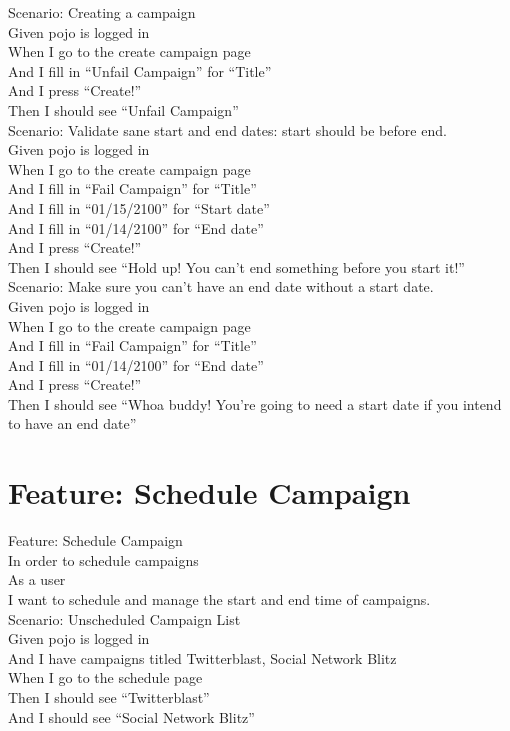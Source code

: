 \documentclass[12pt]{article}
\begin{document}
Scenario: Creating a campaign \\
Given pojo is logged in \\
When I go to the create campaign page \\
And I fill in ``Unfail Campaign'' for ``Title'' \\
And I press ``Create!'' \\
Then I should see ``Unfail Campaign'' \\

Scenario: Validate sane start and end dates: start should be before end. \\
Given pojo is logged in \\
When I go to the create campaign page \\
And I fill in ``Fail Campaign'' for ``Title'' \\
And I fill in ``01/15/2100'' for ``Start date'' \\
And I fill in ``01/14/2100'' for ``End date'' \\
And I press ``Create!'' \\
Then I should see ``Hold up! You can't end something before you start it!'' \\

Scenario: Make sure you can't have an end date without a start date. \\
Given pojo is logged in \\
When I go to the create campaign page \\
And I fill in ``Fail Campaign'' for ``Title'' \\
And I fill in ``01/14/2100'' for ``End date'' \\
And I press ``Create!'' \\
Then I should see ``Whoa buddy! You're going to need a start date if you intend to have an end date'' \\

\section{Feature: Schedule Campaign}

Feature: Schedule Campaign \\
In order to schedule campaigns \\
As a user \\
I want to schedule and manage the start and end time of campaigns. \\

Scenario: Unscheduled Campaign List \\
  Given pojo is logged in \\
  And I have campaigns titled Twitterblast, Social Network Blitz \\
  When I go to the schedule page \\
  Then I should see ``Twitterblast'' \\
  And I should see ``Social Network Blitz'' \\
  
\end{document}
